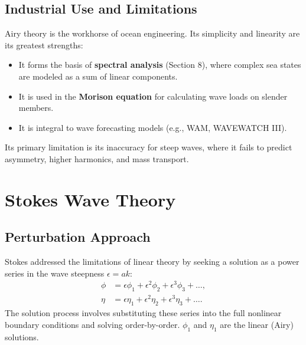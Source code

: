 \documentclass[11pt,letterpaper]{article}
\begin{document}
\subsection{Industrial Use and Limitations}
Airy theory is the workhorse of ocean engineering. Its simplicity and linearity are its greatest strengths:
\begin{itemize}
    \item It forms the basis of \textbf{spectral analysis} (Section 8), where complex sea states are modeled as a sum of linear components.
    \item It is used in the \textbf{Morison equation} for calculating wave loads on slender members.
    \item It is integral to wave forecasting models (e.g., WAM, WAVEWATCH III).
\end{itemize}
Its primary limitation is its inaccuracy for steep waves, where it fails to predict asymmetry, higher harmonics, and mass transport.

\section{Stokes Wave Theory}
\subsection{Perturbation Approach}
Stokes addressed the limitations of linear theory by seeking a solution as a power series in the wave steepness $\epsilon = ak$:
\begin{align}
\phi &= \epsilon \phi_1 + \epsilon^2 \phi_2 + \epsilon^3 \phi_3 + \dots, \\
\eta &= \epsilon \eta_1 + \epsilon^2 \eta_2 + \epsilon^3 \eta_3 + \dots.
\end{align}
The solution process involves substituting these series into the full nonlinear boundary conditions and solving order-by-order. $\phi_1$ and $\eta_1$ are the linear (Airy) solutions.
\end{document}
